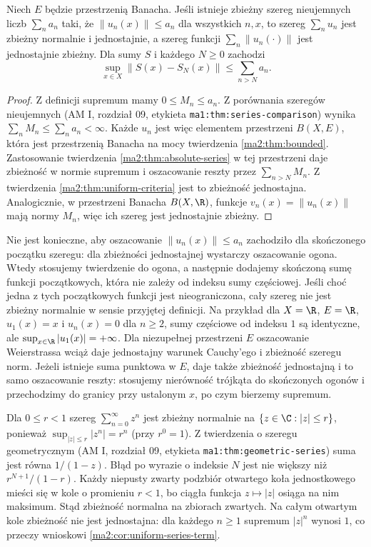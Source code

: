 \begin{twierdzenie}
\label{ma2:thm:weierstrass-test}
Niech $E$ będzie przestrzenią Banacha. Jeśli
istnieje zbieżny szereg nieujemnych liczb
$\sum_n a_n$ taki, że
$\|u_n(x)\|\le a_n$ dla wszystkich $n,x$,
to szereg $\sum_n u_n$ jest zbieżny normalnie
i jednostajnie, a szereg funkcji
$\sum_n\|u_n(\cdot)\|$ jest jednostajnie zbieżny.
Dla sumy $S$ i każdego $N\ge0$ zachodzi
\[
 \sup_{x\in X}\|S(x)-S_N(x)\|
 \le\sum_{n>N}a_n.
\]
\end{twierdzenie}
\begin{proof}
Z definicji supremum mamy $0\le M_n\le a_n$.
Z porównania szeregów nieujemnych (AM I,
rozdział 09, etykieta \texttt{ma1:thm:series-comparison})
wynika $\sum_n M_n\le\sum_n a_n<\infty$.
Każde $u_n$ jest więc elementem przestrzeni $B(X,E)$,
która jest przestrzenią Banacha na mocy
twierdzenia \ref{ma2:thm:bounded}. Zastosowanie
twierdzenia \ref{ma2:thm:absolute-series} w tej
przestrzeni daje zbieżność w normie supremum
i oszacowanie reszty przez $\sum_{n>N}M_n$.
Z twierdzenia \ref{ma2:thm:uniform-criteria}
jest to zbieżność jednostajna.
Analogicznie, w przestrzeni Banacha $B(X,\R)$,
funkcje $v_n(x)=\|u_n(x)\|$ mają normy $M_n$,
więc ich szereg jest jednostajnie zbieżny.
\end{proof}
Nie jest konieczne, aby oszacowanie
$\|u_n(x)\|\le a_n$ zachodziło dla skończonego
początku szeregu: dla zbieżności jednostajnej
wystarczy oszacowanie ogona. Wtedy stosujemy
twierdzenie do ogona, a następnie dodajemy
skończoną sumę funkcji początkowych, która
nie zależy od indeksu sumy częściowej.
Jeśli choć jedna z tych początkowych funkcji
jest nieograniczona, cały szereg nie jest zbieżny
normalnie w sensie przyjętej definicji.
Na przykład dla $X=\R$, $E=\R$, $u_1(x)=x$
i $u_n(x)=0$ dla $n\ge2$, sumy częściowe
od indeksu $1$ są identyczne, ale
$\sup_{x\in\R}|u_1(x)|=+\infty$.
Dla niezupełnej przestrzeni $E$ oszacowanie
Weierstrassa wciąż daje jednostajny warunek
Cauchy'ego i zbieżność szeregu norm. Jeżeli
istnieje suma punktowa w $E$, daje także
zbieżność jednostajną i to samo oszacowanie reszty:
stosujemy nierówność trójkąta do skończonych
ogonów i przechodzimy do granicy przy ustalonym $x$,
po czym bierzemy supremum.

\begin{przyklad}
\label{ma2:ex:function-geometric}
Dla $0\le r<1$ szereg $\sum_{n=0}^\infty z^n$
jest zbieżny normalnie na $\{z\in\C:|z|\le r\}$,
ponieważ $\sup_{|z|\le r}|z^n|=r^n$ (przy $r^0=1$).
Z twierdzenia o szeregu geometrycznym
(AM I, rozdział 09, etykieta \texttt{ma1:thm:geometric-series})
suma jest równa $1/(1-z)$. Błąd po wyrazie
o indeksie $N$ jest nie większy niż
$r^{N+1}/(1-r)$.
Każdy niepusty zwarty podzbiór otwartego koła
jednostkowego mieści się w kole o promieniu $r<1$,
bo ciągła funkcja $z\mapsto |z|$ osiąga na nim maksimum.
Stąd zbieżność normalna na zbiorach zwartych.
Na całym otwartym kole zbieżność nie jest jednostajna:
dla każdego $n\ge1$ supremum $|z|^n$ wynosi $1$,
co przeczy wnioskowi \ref{ma2:cor:uniform-series-term}.
\end{przyklad}

